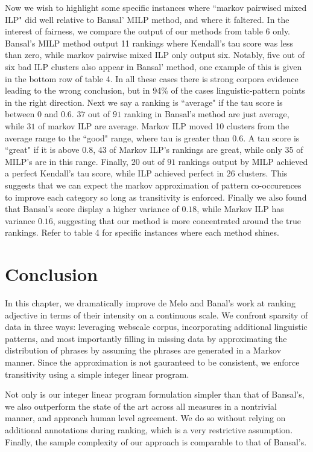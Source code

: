 Now we wish to highlight some specific instances where ``markov pairwised mixed ILP" did well relative to Bansal' MILP method, and where it faltered. In the interest of fairness, we compare the output of our methods from table 6 only. Bansal's MILP method output 11 rankings where Kendall's tau score was less than zero, while  markov pairwise mixed ILP only output six. Notably, five out of six bad ILP clusters also appear in Bansal' method, one example of this is given in the bottom row of table 4. In all these cases there is strong corpora evidence leading to the wrong conclusion, but in 94\% of the cases linguistic-pattern points in the right direction. Next we say a ranking is ``average" if the tau score is between $0$ and $0.6$. $37$ out of $91$ ranking in Bansal's method are just average, while $31$ of markov ILP are average. Markov ILP moved 10 clusters from the average range to the ``good" range, where tau is greater than $0.6$. A tau score is ``great" if it is above $0.8$, 43 of Markov ILP's rankings are great, while only 35 of MILP's are in this range. Finally, $20$ out of $91$ rankings output by MILP achieved a perfect Kendall's tau score, while ILP achieved perfect in $26$ clusters. This suggests that we can expect the markov approximation of pattern co-occurences to improve each category so long as transitivity is enforced. Finally we also found that Bansal's score display a higher variance of $0.18$, while Markov ILP has variance $0.16$, suggesting that our method is more concentrated around the true rankings. Refer to table 4 for specific instances where each method shines. 


\section{Conclusion}

In this chapter, we dramatically improve de Melo and Banal's work at ranking adjective in terms of their intensity on a continuous scale. We confront sparsity of data in three ways: leveraging webscale corpus, incorporating additional linguistic patterns, and most importantly filling in missing data by approximating the distribution of phrases by assuming the phrases are generated in a Markov manner. Since the approximation is not gauranteed to be consistent, we enforce transitivity using a simple integer linear program. 

Not only is our integer linear program formulation simpler than that of Bansal's, we also outperform the state of the art across all measures in a nontrivial manner, and approach human level agreement. We do so without relying on additional annotations during ranking, which is a very restrictive assumption. Finally, the sample complexity of our approach is comparable to that of Bansal's. 


